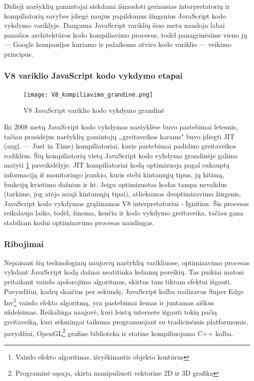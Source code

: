 \documentclass{VUMIFPSkursinis}
\begin{document}
Didieji naršyklių gamintojai siekdami išnaudoti geriausias interpretatorių ir kompiliatorių savybes įdiegė naujus papildomus žingsnius JavaScript kodo vykdymo variklyje. Dauguma JavaScript variklių šiuo metu naudoja labai panašios architektūros kodo kompiliavimo procesus, todėl panagrinėsime vieno jų — Google kompanijos kuriamo ir palaikomo atviro kodo variklio — veikimo principus.

\subsubsection{V8 variklio JavaScript kodo vykdymo etapai}
\begin{figure}[h!]
  \begin{center}
  \texttt{[image: V8\_kompiliavimo\_grandinė.png]}
  \end{center}
  \caption{V8 JavaScript variklio kodo vykdymo grandinė \cite{Kad19}}
  \label{fig:v8_pipeline}
\end{figure}

Iki 2008 metų JavaScript kodo vykdymas naršyklėse buvo pastebimai lėtesnis, tačiau prasidėjus naršyklių gamintojų „greitaveikos karams" buvo įdiegti JIT (angl. — Just in Time) kompiliatoriai, kurie pastebimai padidino greitaveikos rodiklius. \cite{Cal17} Šių kompiliatorių vietą JavaScript kodo vykdymo grandinėje galima matyti \ref{fig:v8_pipeline} paveikslėlyje.
JIT kompiliatoriai kodą optimizuoja pagal sukauptą informaciją iš monitoringo įrankio, kuris stebi kintamųjų tipus, jų kitimą, funkcijų kvietimo dažnius ir kt. Jeigu optimizuotas kodas tampa nevalidus (tarkime, jog atėjo nauji kintamųjų tipai), atliekamas deoptimizavimo žingsnis, JavaScript kodo vykdymas grąžinamas V8 interpretatoriui - Ignition. Šis procesas reikalauja laiko, todėl, žinoma, kenčia ir kodo vykdymo greitaveika, tačiau gana stabiliam kodui optimizavimo procesas naudingas.
\subsubsection{Ribojimai}
Nepaisant šių technologinių naujovių naršyklių varikliuose, optimizavimo procesas vykdant JavaScript kodą dažnai neatitinka keliamų poreikių. Tas puikiai matosi pritaikant vaizdo apdorojimo algoritmus, skirtus tam tikram efektui išgauti. Pavyzdžiui, kadrų skaičius per sekundę, JavaScript kalba realizavus Super Edge Inv\footnote{Vaizdo efekto algoritmas, išryškinantis objekto kontūrus} vaizdo efekto algoritmą, yra pastebimai žemas ir juntamas aiškus uždelsimas. \cite{WVE17} Reikalinga naujovė, kuri leistų internete išgauti tokią pačią greitaveiką, kuri sėkmingai taikoma programuojant su tradicinėmis platformomis, pavydžiui, OpenGL\footnote{Programinė sąsaja, skirta manipuliuoti vektorine 2D ir 3D grafika} grafine biblioteka ir statine kompiliuojama C++ kalba.
\end{document}
